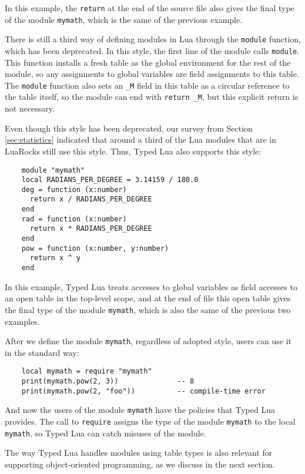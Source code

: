 In this example, the \texttt{return} at the end of the source file
also gives the final type of the module \texttt{mymath}, which is
the same of the previous example.

There is still a third way of defining modules in Lua through the
\texttt{module} function, which has been deprecated.
In this style, the first line of the module calls \texttt{module}.
This function installs a fresh table as the global environment for
the rest of the module, so any assignments to global variables are
field assignments to this table.
The \texttt{module} function also sets an \texttt{\string_M} field
in this table as a circular reference to the table itself,
so the module can end with \texttt{return \string_M},
but this explicit return is not necessary.

Even though this style has been deprecated, our survey from
Section \ref{sec:statistics} indicated that around a third of the
Lua modules that are in LuaRocks still use this style.
Thus, Typed Lua also supports this style:
\begin{verbatim}
    module "mymath"
    local RADIANS_PER_DEGREE = 3.14159 / 180.0
    deg = function (x:number)
      return x / RADIANS_PER_DEGREE
    end
    rad = function (x:number)
      return x * RADIANS_PER_DEGREE
    end
    pow = function (x:number, y:number)
      return x ^ y
    end
\end{verbatim}

In this example, Typed Lua treats accesses to global variables as
field accesses to an open table in the top-level scope,
and at the end of file this open table gives the final type of the
module \texttt{mymath}, which is also the same of the previous two
examples.

After we define the module \texttt{mymath}, regardless of adopted style,
users can use it in the standard way:
\begin{verbatim}
    local mymath = require "mymath"
    print(mymath.pow(2, 3))              -- 8
    print(mymath.pow(2, "foo"))          -- compile-time error
\end{verbatim}

And now the users of the module \texttt{mymath} have the policies that
Typed Lua provides.
The call to \texttt{require} assigns the type of the module \texttt{mymath}
to the local \texttt{mymath}, so Typed Lua can catch misuses of the module.

The way Typed Lua handles modules using table types is also
relevant for supporting object-oriented programming, as we discuss in
the next section.

